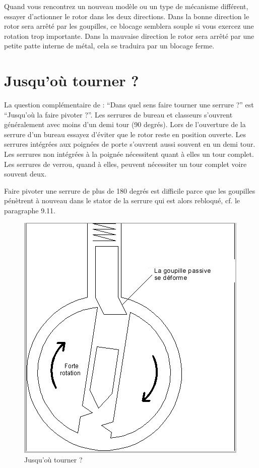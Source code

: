 \documentclass[a4paper,french,11pt,twoside]{report}
\begin{document}
Quand vous rencontrez un nouveau modèle ou un type de mécanisme différent, essayer d'actionner le rotor dans les deux directions. Dans la bonne direction le rotor sera arrêté par les goupilles, ce blocage semblera souple si vous exercez une rotation trop importante. Dans la mauvaise direction le rotor sera arrêté par une petite patte interne de métal, cela se traduira par un blocage ferme.

\section{Jusqu'où tourner ?}

La question complémentaire de : \enquote{Dans quel sens faire tourner une serrure ?} est \enquote{Jusqu'où la faire pivoter ?}. Les serrures de bureau et classeurs s'ouvrent généralement avec moins d'un demi tour (90 degrés). Lors de l'ouverture de la serrure d'un bureau essayez d'éviter que le rotor reste en position ouverte. Les serrures intégrées aux poignées de porte s'ouvrent aussi souvent en un demi tour. Les serrures non intégrées à la poignée nécessitent quant à elles un tour complet. Les serrures de verrou, quand à elles, peuvent nécessiter un tour complet voire souvent deux.

Faire pivoter une serrure de plus de 180 degrés est difficile parce que les goupilles pénètrent à nouveau dans le stator de la serrure qui est alors rebloqué, cf. le paragraphe 9.11.


\begin{figure}[h] \begin{center}
        \includegraphics[scale=0.7]{images/Image18}
        \caption{Jusqu'où tourner ?}
\end{center} \end{figure}
\end{document}
